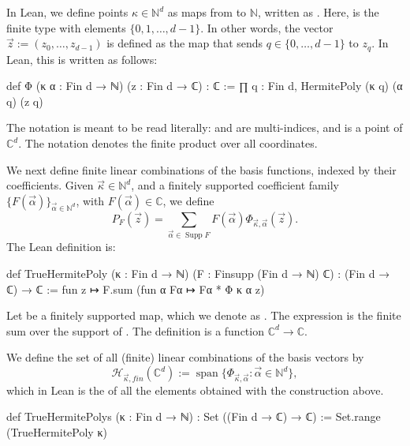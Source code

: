 \documentclass[11pt]{amsart}
\theoremstyle{remark}
\newcommand{\C}{\mathbb{C}}
\newcommand{\N}{\mathbb{N}}
\begin{document}
    In Lean, we define points $\kappa \in \mathbb N^d$ as maps from  to $\mathbb N$, written as  {}. Here, \mbox{} is the finite type with elements
    $\{0,1,\ldots,d-1\}$. In other words, the vector $\vec z := (z_0,\ldots,z_{d-1})$ is defined as the map that sends $q \in \{0, \dots, d-1\}$ to $z_q$.
    In Lean, this is written as follows:
\begin{leancode}
def Φ (κ α : Fin d → ℕ) (z : Fin d → ℂ) : ℂ :=
  ∏ q : Fin d, HermitePoly (κ q) (α q) (z q)
\end{leancode}
The notation is meant to be read literally: {} and {}are
multi-indices, and {} is a point of $\C^d$.  The notation {} denotes the finite product over all coordinates.
 \vspace{0.5em}

We next define finite linear combinations of the basis functions, indexed by their coefficients.
Given $\vec\kappa\in\mathbb N^d$, and a finitely supported coefficient family $\{F({\vec \alpha})\}_{\vec \alpha\in \mathbb N^d}$, with $F({\vec \alpha})\in \mathbb C$, we define
\[
    P_F(\vec z)
    = \sum_{\vec\alpha\in \operatorname{Supp}F}
      F(\vec\alpha)\Phi_{\vec\kappa,\vec\alpha}(\vec z).
\]
The Lean definition is:
\begin{leancode}
def TrueHermitePoly (κ : Fin d → ℕ)
    (F : Finsupp (Fin d → ℕ) ℂ) : (Fin d → ℂ) → ℂ :=
  fun z ↦ F.sum (fun α Fα ↦ Fα * Φ κ α z)
\end{leancode}
Let  be a finitely supported map, which we denote as {}. The expression {} is the
finite sum over the support of .  The definition
{} is a function $\C^d\to\C$. 
 \vspace{0.5em}



We define the set of all (finite) linear combinations of the basis vectors by $$\mathcal H_{\vec \kappa, fin}(\mathbb C^d) := \operatorname{span}\{\Phi_{\vec\kappa, \vec\alpha} :\vec \alpha \in \N^d\},$$ which in Lean is the  of all the elements obtained with the construction above.

\begin{leancode}
def TrueHermitePolys (κ : Fin d → ℕ) :
    Set ((Fin d → ℂ) → ℂ) :=
  Set.range (TrueHermitePoly κ)
\end{leancode}
\end{document}
